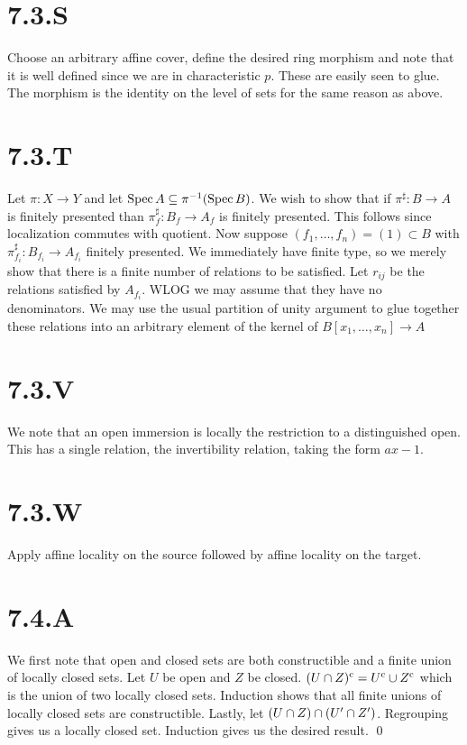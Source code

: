 \documentclass{article}
\begin{document}
\section{7.3.S}
Choose an arbitrary affine cover, define the desired ring morphism and note
that it is well defined since we are in characteristic $p$.
These are easily seen to glue. The morphism is the identity on the level of
sets for the same reason as above.

\section{7.3.T}
Let $\pi: X \to Y$ and let $\operatorname{Spec} A \subseteq \pi^{-1}(\operatorname{Spec} B)$. We wish to show
that if $\pi^{\sharp}: B \to A$ is finitely presented than
$\pi_f^{\sharp}: B_f \to A_f$ is finitely presented. This follows since localization
commutes with quotient. Now suppose $(f_1, \dots, f_n)=(1) \subset B$ with
$\pi_{f_i}^{\sharp}: B_{f_i} \to
    A_{f_i}$ finitely presented. We immediately have finite type, so
we merely show that there is a finite number of relations to be satisfied. Let
$r_{ij}$ be the relations satisfied by $A_{f_i}$.
WLOG we may assume that they have no denominators. We may use the usual
partition of unity argument to glue together these relations into an arbitrary
element of the kernel of $B[x_1, \dots, x_n] \to A$

\section{7.3.V}
We note that an open immersion is locally the restriction to a distinguished
open. This has a single relation, the invertibility relation, taking the form
$ax-1$.

\section{7.3.W}
Apply affine locality on the source followed by affine locality on the target.

\section{7.4.A}
We first note that open and closed sets are both constructible and a finite
union of locally closed sets. Let $U$ be open and
$Z$ be closed. $(U \cap
    Z)^{\text{c}}=U^{\text{c}} \cup
    Z^{\text{c}}$ which is the union
of two locally closed sets. Induction shows that all finite unions of locally
closed sets are constructible. Lastly, let $(U \cap Z) \cap (U' \cap Z')$. Regrouping
gives us a locally closed set. Induction gives us the desired result. \qed
\end{document}
